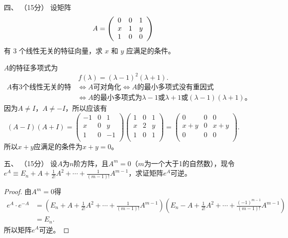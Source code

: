 \begin{enumerate}[1~]
\item[四、]（15分）
设矩阵 
$$
A = \left( \begin{array} { l l l } { 0 } & { 0 } & { 1 } \\ { x } & { 1 } & { y } \\ { 1 } & { 0 } & { 0 } \end{array} \right)
$$
有 3 个线性无关的特征向量，求 $x$ 和 $y$ 应满足的条件。
\begin{solution}
$A$的特征多项式为\[
f(\lambda)=(\lambda-1)^2(\lambda+1).
\]
\begin{align*}
\text{$A$有3个线性无关的特征向量}&\Longleftrightarrow \text{$A$可对角化}\Longleftrightarrow \text{$A$的最小多项式没有重因式}\\
&\Longleftrightarrow \text{$A$的最小多项式为$\lambda-1$或$\lambda+1$或$(\lambda-1)(\lambda+1)$。}
\end{align*}
因为$A\ne I$，$A\ne -I$，所以应该有\[
(A-I)(A+I)=\left( \begin{matrix}
	-1&		0&		1\\
	x&		0&		y\\
	1&		0&		-1\\
\end{matrix} \right) \left( \begin{matrix}
	1&		0&		1\\
	x&		2&		y\\
	1&		0&		1\\
\end{matrix} \right) =\left( \begin{matrix}
	0&		0&		0\\
	x+y&		0&		x+y\\
	0&		0&		0\\
\end{matrix} \right) .
\]
所以$x+y$应满足的条件为$x+y=0$。
\end{solution}

\item[五、]（15分）
设$A$为$n$阶方阵，且$A^m=0$（$m$为一个大于1的自然数），现令$e ^ { A } \equiv E _ { n } + A + \frac { 1 } { 2 ! } A ^ { 2 } + \cdots + \frac { 1 } { ( m - 1 ) ! } A ^ { m - 1 }$，求证矩阵$e^A$可逆。
\begin{proof}
由$A^m=0$得\begin{align*}
e^A\cdot e^{-A}&=\left(E _ { n } + A + \frac { 1 } { 2 ! } A ^ { 2 } + \cdots + \frac { 1 } { ( m - 1 ) ! } A ^ { m - 1 }\right)\left(E _ { n } - A + \frac { 1 } { 2 ! } A ^ { 2 } + \cdots + \frac { (-1)^{m-1} } { ( m - 1 ) ! } A ^ { m - 1 }\right)\\
&=E_n.
\end{align*}
所以矩阵$e^A$可逆。
\end{proof}


\end{enumerate}

